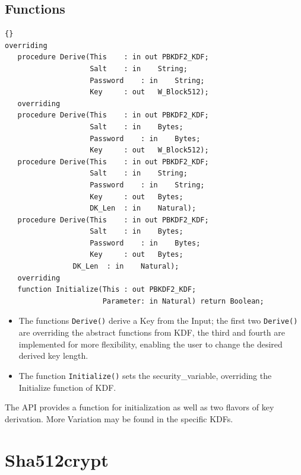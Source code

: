 \subsection*{Functions}
\begin{lstlisting}{}
overriding
   procedure Derive(This	: in out PBKDF2_KDF;
                    Salt	: in 	String;
                    Password	: in	String;
                    Key		: out	W_Block512);
   overriding
   procedure Derive(This	: in out PBKDF2_KDF;
                    Salt	: in 	Bytes;
                    Password	: in	Bytes;
                    Key		: out	W_Block512);
   procedure Derive(This	: in out PBKDF2_KDF;
                    Salt	: in 	String;
                    Password	: in	String;
                    Key		: out	Bytes;
                    DK_Len	: in 	Natural);
   procedure Derive(This	: in out PBKDF2_KDF;
                    Salt	: in 	Bytes;
                    Password	: in	Bytes;
                    Key		: out	Bytes;
      		    DK_Len	: in 	Natural);
   overriding
   function Initialize(This	: out PBKDF2_KDF;
                       Parameter: in Natural) return Boolean; 

\end{lstlisting}
\begin{itemize}
	\item The functions \texttt{Derive()} derive a Key from the Input; the first two \texttt{Derive()} are overriding the abstract functions from KDF, the third and fourth are implemented for more flexibility, enabling the user to change the desired derived key length.
	\item The function \texttt{Initialize()} sets the security\_variable, overriding the Initialize function of KDF.
\end{itemize}
The API provides a function for initialization as well as two flavors of key derivation. More Variation may be found in the specific KDFs. 





\section{Sha512crypt}

